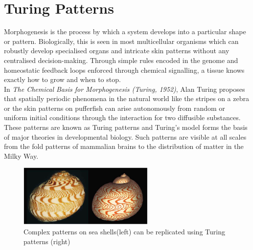 
\section{Turing Patterns}
Morphogenesis is the process by which a system develops into a particular shape or pattern.  Biologically, this is seen in most multicellular organisms which can robustly develop specialised organs and intricate skin patterns without any centralised decision-making. Through simple rules encoded in the genome and homeostatic feedback loops enforced through chemical signalling, a tissue knows exactly how to grow and when to stop.\\

In \textit{The Chemical Basis for Morphogenesis (Turing, 1952)\cite{turing1990chemical}}, Alan Turing proposes that spatially periodic phenomena in the natural world like the stripes on a zebra or the skin patterns on pufferfish can arise autonomously from random or uniform initial conditions through the interaction for two diffusible substances. These patterns are known as Turing patterns and Turing's model forms the basis of major theories in developmental biology. Such patterns are visible at all scales from the fold patterns of mammalian brains\cite{cartwright2002labyrinthine} to the distribution of matter in the Milky Way\cite{smolin1996galactic}.

\begin{figure}[!h]
\centering
\includegraphics[width=0.6\textwidth]{images/turing-shell.png}
\caption{Complex patterns on sea shells(left) can be replicated using Turing patterns (right) \cite{meinhardt2009algorithmic}}
\label{fig:seashells}
\end{figure}

